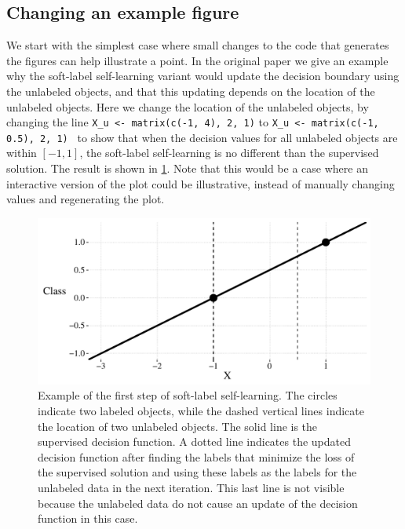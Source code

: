 \documentclass[runningheads,a4paper]{llncs}\usepackage[]{graphicx}\usepackage[]{color}
\newenvironment{knitrout}{}{} %
\newcommand{\inlinecode}{\texttt}
\begin{document}
\subsection{Changing an example figure}
We start with the simplest case where small changes to the code that generates the figures can help illustrate a point. In the original paper we give an example why the soft-label self-learning variant would update the decision boundary using the unlabeled objects, and that this updating depends on the location of the unlabeled objects. Here we change the location of the unlabeled objects, by changing the line \inlinecode{X\_u <-  matrix(c(-1, 4), 2, 1)} to \inlinecode{X\_u <-  matrix(c(-1, 0.5), 2, 1) } to show that when the decision values for all unlabeled objects are within $[-1,1]$, the soft-label self-learning is no different than the supervised solution. The result is shown in \cref{fig:simple-example}. Note that this would be a case where an interactive version of the plot could be illustrative, instead of manually changing values and regenerating the plot.

\begin{knitrout}
\color{fgcolor}\begin{figure}

{\centering \includegraphics[width=0.8\linewidth]{figure/simple-example-1} 

}

\caption[Example of the first step of soft-label self-learning]{Example of the first step of soft-label self-learning. The circles indicate two labeled objects, while the dashed vertical lines indicate the location of two unlabeled objects. The solid line is the supervised decision function. A dotted line indicates the updated decision function after finding the labels that minimize the loss of the supervised solution and using these labels as the labels for the unlabeled data in the next iteration. This last line is not visible because the unlabeled data do not cause an update of the decision function in this case.}\label{fig:simple-example}
\end{figure}


\end{knitrout}
\end{document}

